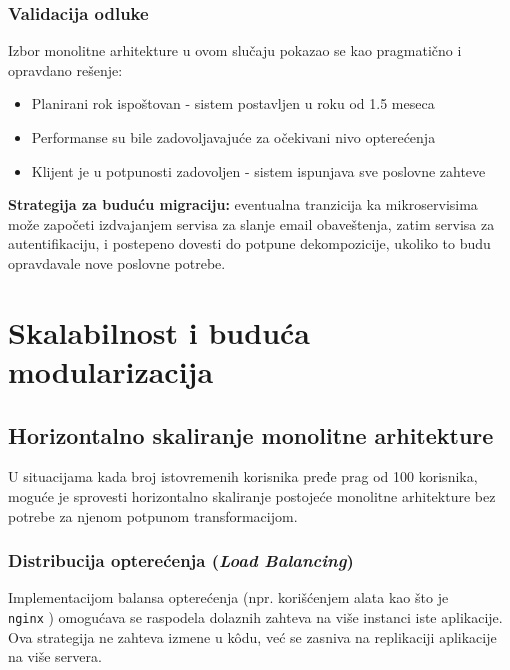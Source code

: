 \documentclass[12pt]{article}
\begin{document}
    \newpage

    \subsubsection*{Validacija odluke}

    Izbor monolitne arhitekture u ovom slučaju pokazao se kao pragmatično i opravdano rešenje:
    \begin{itemize}
    \item Planirani rok ispoštovan - sistem postavljen u roku od 1.5 meseca
    \item Performanse su bile zadovoljavajuće za očekivani nivo opterećenja
    \item Klijent je u potpunosti zadovoljen - sistem ispunjava sve poslovne zahteve
    \end{itemize}

    \textbf{Strategija za buduću migraciju:} eventualna tranzicija ka mikroservisima može započeti izdvajanjem servisa za slanje email obaveštenja, zatim servisa za autentifikaciju, i postepeno dovesti do potpune dekompozicije, ukoliko to budu opravdavale nove poslovne potrebe.

    \newpage
    \section{Skalabilnost i buduća modularizacija}

    \subsection{Horizontalno skaliranje monolitne arhitekture}

    U situacijama kada broj istovremenih korisnika pređe prag od 100 korisnika, moguće je sprovesti horizontalno skaliranje postojeće monolitne arhitekture bez potrebe za njenom potpunom transformacijom.

    \subsubsection*{Distribucija opterećenja (\textit{Load Balancing})}

    Implementacijom balansa opterećenja (npr. korišćenjem alata kao što je \\ \texttt{nginx} \cite{nginx}) omogućava se raspodela dolaznih zahteva na više instanci iste aplikacije. Ova strategija ne zahteva izmene u kôdu, već se zasniva na replikaciji aplikacije na više servera.
\end{document}
